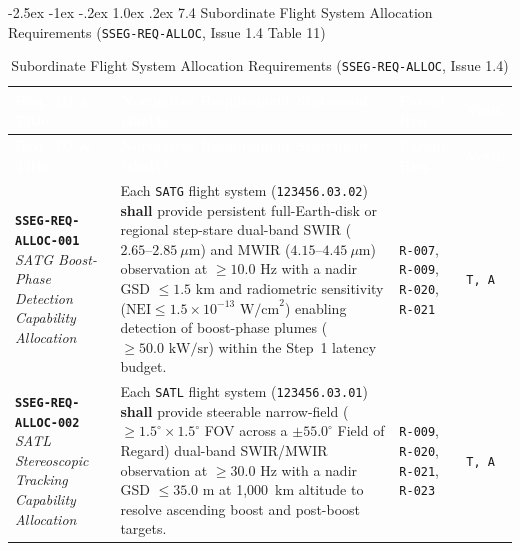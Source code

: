 \documentclass[11pt,a4paper]{article}
\makeatletter
\renewcommand\subsection{\@startsection{subsection}{2}{\z@}%
    {-2.5ex \@plus -1ex \@minus -.2ex}%
    {1.0ex \@plus .2ex}%
    {\normalfont\large\bfseries\sffamily\color{SubHeadingBlue}}}
\newcommand{\thead}[1]{\textcolor{white}{\textbf{\textsf{#1}}}}
\providecommand{\abbr}[1]{#1}
\makeatother
\begin{document}
{\begin{longtable}{|>{\raggedright\arraybackslash}p{}|>{\raggedright\arraybackslash}p{}|>{\raggedright\arraybackslash}p{}|>{\raggedright\arraybackslash}p{}|}
\end{longtable}}

\subsection{7.4 Subordinate Flight System Allocation Requirements (\texttt{SSEG-REQ-ALLOC}, Issue 1.4 Table 11)}

{\footnotesize\setlength{\tabcolsep}{4pt}\renewcommand{\arraystretch}{1.15}%
%
%
\setlength{\LTcapwidth}{\textwidth}%
\begin{longtable}{|>{\raggedright\arraybackslash}p{}|>{\raggedright\arraybackslash}p{}|>{\raggedright\arraybackslash}p{}|>{\raggedright\arraybackslash}p{}|}
\caption{Subordinate Flight System Allocation Requirements (\texttt{SSEG-REQ-ALLOC}, Issue 1.4)}\label{tab:req_alloc_i14}\\
\hline
\rowcolor{TableHeaderBlue}
\thead{Req.\ ID \& Title} & \thead{Normative Requirement Statement (\texttt{shall})} & \thead{Parent Req.} & \thead{Verif.} \\ \hline
\endfirsthead
\hline
\rowcolor{TableHeaderBlue}
\thead{Req.\ ID \& Title} & \thead{Normative Requirement Statement (\texttt{shall})} & \thead{Parent Req.} & \thead{Verif.} \\ \hline
\endhead
\endfoot
\endlastfoot
\textbf{\texttt{SSEG-REQ-ALLOC-001}} \newline \emph{SATG Boost-Phase Detection Capability Allocation} & Each \texttt{SATG} flight system (\texttt{123456.03.02}) \textbf{shall} provide persistent full-Earth-disk or regional step-stare dual-band \abbr{SWIR} ($2.65\text{--}2.85~\mu\mathrm{m}$) and \abbr{MWIR} ($4.15\text{--}4.45~\mu\mathrm{m}$) observation at $\ge 10.0\text{ Hz}$ with a nadir \abbr{GSD} $\le 1.5\text{ km}$ and radiometric sensitivity ($\text{NEI} \le 1.5 \times 10^{-13}\text{ W/cm}^2$) enabling detection of boost-phase plumes ($\ge 50.0\text{ kW/sr}$) within the Step~1 latency budget. & \texttt{R-007}, \texttt{R-009}, \texttt{R-020}, \texttt{R-021} & \texttt{T, A} \\ \hline
\textbf{\texttt{SSEG-REQ-ALLOC-002}} \newline \emph{SATL Stereoscopic Tracking Capability Allocation} & Each \texttt{SATL} flight system (\texttt{123456.03.01}) \textbf{shall} provide steerable narrow-field ($\ge 1.5^\circ \times 1.5^\circ$ \abbr{FOV} across a $\pm 55.0^\circ$ Field of Regard) dual-band \abbr{SWIR}/\abbr{MWIR} observation at $\ge 30.0\text{ Hz}$ with a nadir \abbr{GSD} $\le 35.0\text{ m}$ at 1,000~km altitude to resolve ascending boost and post-boost targets. & \texttt{R-009}, \texttt{R-020}, \texttt{R-021}, \texttt{R-023} & \texttt{T, A} \\ \hline

\end{longtable}}
\end{document}
